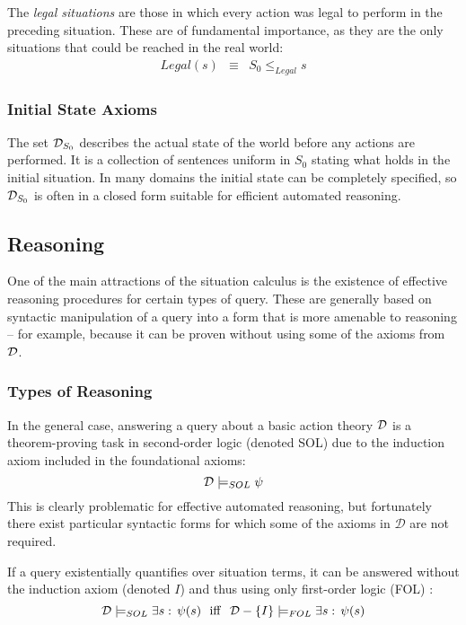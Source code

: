 The \emph{legal situations} are those in which every action was legal
to perform in the preceding situation. These are of fundamental importance,
as they are the only situations that could be reached in the real
world:\begin{eqnarray*}
Legal(s) & \equiv & S_{0}\leq_{Legal}s\end{eqnarray*}



\subsubsection{Initial State Axioms}

The set $\mathcal{D}_{S_{0}}$ describes the actual state of the world before
any actions are performed. It is a collection of sentences uniform
in $S_{0}$ stating what holds in the initial situation. In many domains
the initial state can be completely specified, so $\mathcal{D}_{S_{0}}$ is
often in a closed form suitable for efficient automated reasoning.


\subsection{Reasoning}

One of the main attractions of the situation calculus is the existence
of effective reasoning procedures for certain types of query. These
are generally based on syntactic manipulation of a query into a form
that is more amenable to reasoning -- for example, because it can
be proven without using some of the axioms from $\mathcal{D}$.


\subsubsection{Types of Reasoning}

In the general case, answering a query about a basic action theory
$\mathcal{D}$ is a theorem-proving task in second-order logic (denoted SOL)
due to the induction axiom included in the foundational axioms:\[
\mathcal{D}\models_{SOL}\psi\]
 This is clearly problematic for effective automated reasoning, but
fortunately there exist particular syntactic forms for which some
of the axioms in $\mathcal{D}$ are not required.

If a query existentially quantifies over situation terms, it can be
answered without the induction axiom (denoted $I$) and thus using
only first-order logic (FOL) \citep{pirri99contributions_sitcalc}:\[
\mathcal{D}\models_{SOL}\exists s:\,\psi(s)\,\,\,\,\mathrm{iff}\,\,\,\,\mathcal{D}-\{I\}\models_{FOL}\exists s:\,\psi(s)\]


